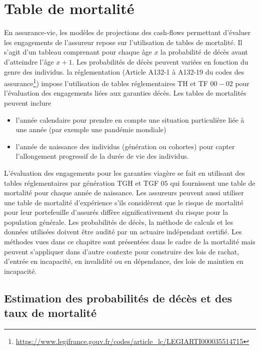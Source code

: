 \chapter{Table de mortalité}\label{chap:mortality_table}

En assurance-vie, les modèles de projections des cash-flows permettant d'évaluer les engagements de l'assureur repose sur l'utilisation de tables de mortalité. Il s'agit d'un tableau comprenant pour chaque âge $x$ la probabilité de décès avant d'atteindre l'âge $x+1$. Les probabilités de décès peuvent variées en fonction du genre des individus. la réglementation (Article A132-1 à A132-19 du codes des assurance\footnote{\url{https://www.legifrance.gouv.fr/codes/article_lc/LEGIARTI000035514715}}) impose l'utilisation de tables réglementaires TH et TF $00-02$ pour l'évaluation des engagements liées aux garanties décès. Les tables de mortalités peuvent inclure 
\begin{itemize}
\item l'année calendaire pour prendre en compte une situation particulière liée à une année (par exemple une pandémie mondiale)
\item l'année de naissance des individus (génération ou cohortes) pour capter l'allongement progressif de la durée de vie des individus. 
\end{itemize}
L'évaluation des engagements pour les garanties viagère se fait en utilisant des tables réglementaires par génération TGH et TGF $05$ qui fournissent une table de mortalité pour chaque année de naissance. Les assureurs peuvent aussi utiliser une table de mortalité d'expérience s'ils considèrent que le risque de mortalité pour leur portefeuille d'assurés diffère significativement du risque pour la population générale. Les probabilités de décès, la méthode de calculs et les données utilisées doivent être audité par un actuaire indépendant certifié. Les méthodes vues dans ce chapitre sont présentées dans le cadre de la mortalité mais peuvent s'appliquer dans d'autre contexte pour construire des lois de rachat, d'entrée en incapacité, en invalidité ou en dépendance, des lois de maintien en incapacité.
\section{Estimation des probabilités de décès et des taux de mortalité}\label{sec:mortality_rate}
